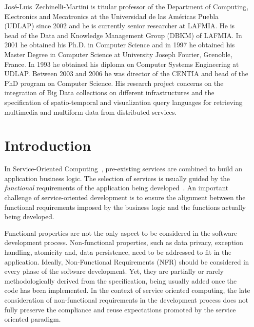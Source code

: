 \documentclass{singlecol-new}
\theoremstyle{TH}{
\newtheorem{lemma}{Lemma}
\newtheorem{theorem}[lemma]{Theorem}
\newtheorem{corrolary}[lemma]{Corrolary}
\newtheorem{conjecture}[lemma]{Conjecture}
\newtheorem{proposition}[lemma]{Proposition}
\newtheorem{claim}[lemma]{Claim}
\newtheorem{stheorem}[lemma]{Wrong Theorem}
\newtheorem{algorithm}{Algorithm}
}
\theoremstyle{THrm}{
\newtheorem{definition}{Definition}[section]
\newtheorem{question}{Question}[section]
\newtheorem{remark}{Remark}
\newtheorem{scheme}{Scheme}
}
\theoremstyle{THhit}{
\newtheorem{case}{Case}[section]
}
\theoremstyle{THhsl}{
\newtheorem{example}{Example}
}
\begin{document}
\begin{bio}
\noindent Jos\'e-Luis~Zechinelli-Martini is titular professor of the Department of Computing, Electronics and Mecatronics at the Universidad de las Américas Puebla (UDLAP) since 2002 and he is currently senior researcher at LAFMIA. He is head of the Data and Knowledge Management Group (DBKM) of LAFMIA. In 2001 he obtained his Ph.D. in Computer Science and in 1997 he obtained his Master Degree in Computer Science at University Joseph Fourier, Grenoble, France. In 1993 he obtained his diploma on Computer Systems Engineering at UDLAP. Between 2003 and 2006 he was director of the CENTIA and head of the PhD program on Computer Science. His research project concerns on the integration of Big Data collections on different infrastructures and the specification of spatio-temporal and visualization query languages for retrieving multimedia and multiform data from distributed services.
\end{bio}


\maketitle


\section{Introduction}
\label{sec:intro}

In Service-Oriented Computing~\cite{Papazoglou2007}, pre-ex\-isting services are
combined to build an application business logic.
The selection of services is usually guided by the \textit{functional}\footnotemark {} requirements of the application being developed~\cite{2,decastro1,PapazoglouH06}.
An important challenge of service-o\-rien\-ted development is  to ensure the alignment between the functional requirements imposed by the business logic and the functions actually being developed.

Functional properties are not the only aspect to be considered in the software development process.
Non-functional properties, such as data privacy, exception handling, atomicity  and, data persistence, need to be addressed to fit in the application.
Ideally, Non-Functional Requirements (NFR) should be considered in every phase of the software development.
Yet, they are partially or rarely methodologically derived from the specification, being usually added once the code has been im\-ple\-men\-ted.
In the context of service oriented computing, the late consideration of non-functional requirements in the development process does not fully preserve the compliance and re\-use expectations promoted by the service oriented paradigm.
\end{document}
